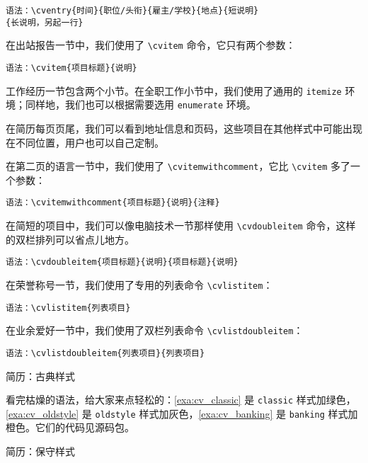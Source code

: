 \verb|语法：\cventry{时间}{职位/头衔}{雇主/学校}{地点}{短说明}|
\newline
\verb|                      {长说明，另起一行}|

在出站报告一节中，我们使用了 \verb|\cvitem| 命令，它只有两个参数：

\verb|语法：\cvitem{项目标题}{说明}|

工作经历一节包含两个小节。在全职工作小节中，我们使用了通用的 \texttt{itemize} 环境；同样地，我们也可以根据需要选用 \texttt{enumerate} 环境。

在简历每页页尾，我们可以看到地址信息和页码，这些项目在其他样式中可能出现在不同位置，用户也可以自己定制。

在第二页的语言一节中，我们使用了 \verb|\cvitemwithcomment|，它比 \verb|\cvitem| 多了一个参数：

\verb|语法：\cvitemwithcomment{项目标题}{说明}{注释}|

在简短的项目中，我们可以像电脑技术一节那样使用 \verb|\cvdoubleitem| 命令，这样的双栏排列可以省点儿地方。

\verb|语法：\cvdoubleitem{项目标题}{说明}{项目标题}{说明}|

在荣誉称号一节，我们使用了专用的列表命令 \verb|\cvlistitem|：

\verb|语法：\cvlistitem{列表项目}|

在业余爱好一节中，我们使用了双栏列表命令 \verb|\cvlistdoubleitem|：

\verb|语法：\cvlistdoubleitem{列表项目}{列表项目}|

\begin{example}[htbp]
\begin{Demo}
\centering
{}
\end{Demo}
\caption{简历：古典样式}
\label{exa:cv_classic}
\end{example}

看完枯燥的语法，给大家来点轻松的：\autoref{exa:cv_classic} 是 \texttt{classic} 样式加绿色，\autoref{exa:cv_oldstyle} 是 \texttt{oldstyle} 样式加灰色，\autoref{exa:cv_banking} 是 \texttt{banking} 样式加橙色。它们的代码见源码包。


\begin{example}[htbp]
\begin{Demo}
\centering
{}
\end{Demo}
\caption{简历：保守样式}
\label{exa:cv_oldstyle}
\end{example}

